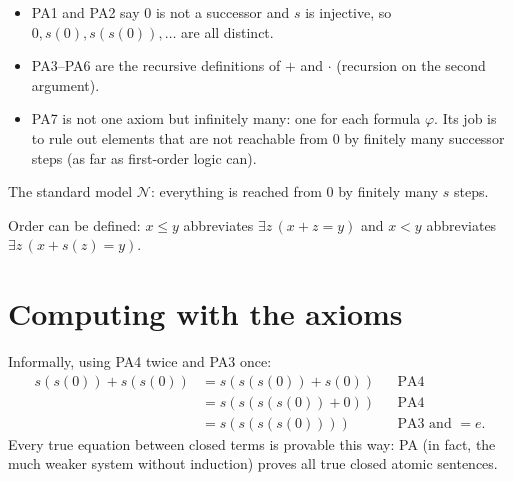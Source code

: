 \begin{itemize}
  \item PA1 and PA2 say $0$ is not a successor and $s$ is injective, so
        $0, s(0), s(s(0)),\dots$ are all distinct.
  \item PA3--PA6 are the recursive definitions of $+$ and $\cdot$ (recursion on the second
        argument).
  \item PA7 is not one axiom but infinitely many: one for each formula $\varphi$. Its
        job is to rule out elements that are not reachable from $0$ by finitely many
        successor steps (as far as first-order logic can).
\end{itemize}

\begin{center}

\small The standard model $\mathcal{N}$: everything is reached from $0$ by finitely many $s$ steps.
\end{center}

Order can be defined: $x\le y$ abbreviates $\exists z\,(x+z=y)$ and $x<y$ abbreviates
$\exists z\,(x+s(z)=y)$.

\section{Computing with the axioms}

\begin{example}[$\overline{2}+\overline{2}=\overline{4}$]
Informally, using PA4 twice and PA3 once:
\begin{align*}
s(s(0))+s(s(0)) &= s(s(s(0))+s(0)) && \text{PA4}\\
 &= s(s(s(s(0))+0)) && \text{PA4}\\
 &= s(s(s(s(0)))) && \text{PA3 and $=e$.}
\end{align*}
Every true equation between closed terms is provable this way: PA (in fact, the much
weaker system without induction) proves all true closed atomic sentences.
\end{example}

